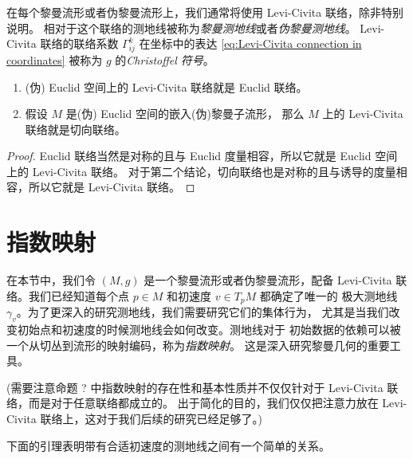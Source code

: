 在每个黎曼流形或者伪黎曼流形上，我们通常将使用 Levi-Civita 联络，除非特别说明。
相对于这个联络的测地线被称为\emph{黎曼测地线}或者\emph{伪黎曼测地线}。
Levi-Civita 联络的联络系数 $\Gamma_{ij}^k$ 在坐标中的表达 
\eqref{eq:Levi-Civita connection in coordinates} 被称为 $g$
的\emph{Christoffel 符号}。

\begin{proposition}
  \mbox{}
  \begin{enumerate}
    \item (伪) Euclid 空间上的 Levi-Civita 联络就是 Euclid 联络。
    \item 假设 $M$ 是(伪) Euclid 空间的嵌入(伪)黎曼子流形，
    那么 $M$ 上的 Levi-Civita 联络就是切向联络。
  \end{enumerate}
\end{proposition}
\begin{proof}
  Euclid 联络当然是对称的且与 Euclid 度量相容，所以它就是 Euclid 空间上的 Levi-Civita 联络。
  对于第二个结论，切向联络也是对称的且与诱导的度量相容，所以它就是 Levi-Civita 联络。
\end{proof}





\section{指数映射}

在本节中，我们令 $(M,g)$ 是一个黎曼流形或者伪黎曼流形，配备 Levi-Civita
联络。我们已经知道每个点 $p\in M$ 和初速度 $v\in T_pM$ 都确定了唯一的
极大测地线 $\gamma_v$。为了更深入的研究测地线，我们需要研究它们的集体行为，
尤其是当我们改变初始点和初速度的时候测地线会如何改变。测地线对于
初始数据的依赖可以被一个从切丛到流形的映射编码，称为\emph{指数映射}。
这是深入研究黎曼几何的重要工具。

(需要注意命题 ? 中指数映射的存在性和基本性质并不仅仅针对于 Levi-Civita 联络，而是对于任意联络都成立的。
出于简化的目的，我们仅仅把注意力放在 Levi-Civita 联络上，这对于我们后续的研究已经足够了。)

下面的引理表明带有合适初速度的测地线之间有一个简单的关系。

